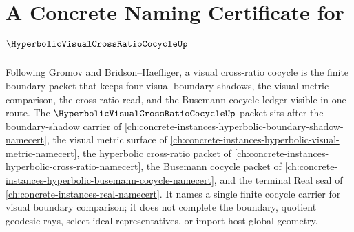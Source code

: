 \chapter{A Concrete Naming Certificate for $\HyperbolicVisualCrossRatioCocycleUp$}
\label{ch:concrete-instances-hyperbolic-visual-cross-ratio-cocycle-namecert}

Following Gromov and Bridson--Haefliger, a visual cross-ratio cocycle is the finite boundary packet that keeps four visual boundary shadows, the visual metric comparison, the cross-ratio read, and the Busemann cocycle ledger visible in one route. The $\HyperbolicVisualCrossRatioCocycleUp$ packet sits after the boundary-shadow carrier of \autoref{ch:concrete-instances-hyperbolic-boundary-shadow-namecert}, the visual metric surface of \autoref{ch:concrete-instances-hyperbolic-visual-metric-namecert}, the hyperbolic cross-ratio packet of \autoref{ch:concrete-instances-hyperbolic-cross-ratio-namecert}, the Busemann cocycle packet of \autoref{ch:concrete-instances-hyperbolic-busemann-cocycle-namecert}, and the terminal Real seal of \autoref{ch:concrete-instances-real-namecert}. It names a single finite cocycle carrier for visual boundary comparison; it does not complete the boundary, quotient geodesic rays, select ideal representatives, or import host global geometry.

